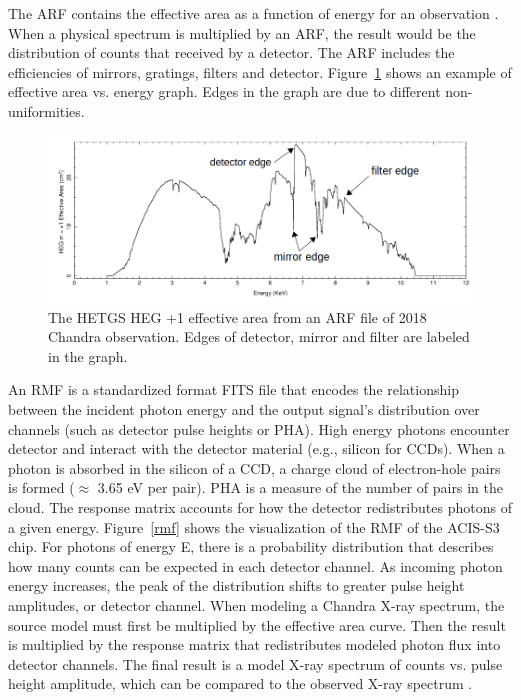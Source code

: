 The ARF contains the effective area as a function of energy for an observation \citep{Huenemoerder_lec_2011}. When a physical spectrum is multiplied by an ARF, the result would be the distribution of counts that received by a detector. The ARF includes the efficiencies of mirrors, gratings, filters and detector.  Figure~\ref{effective} shows an example of effective area vs. energy graph. Edges in the graph are due to different non-uniformities.


\begin{figure}[ht!]
\centering
  \includegraphics[width = \linewidth]{Chapters/Figures/effective_area_label.png}
  \caption{The HETGS HEG +1 effective area from an ARF file of 2018 Chandra observation. Edges of detector, mirror and filter are labeled in the graph.}
  \label{effective}
\end{figure}


An RMF is a standardized format FITS file that encodes the relationship between the incident photon energy and the output signal's distribution over channels (such as detector pulse heights or PHA).  High energy photons encounter detector and interact with the detector material (e.g., silicon for CCDs). When a photon is absorbed in the silicon of a CCD, a charge cloud of electron-hole pairs is formed ($\approx$ 3.65 eV per pair)\citep{Davis2008}. PHA is a measure of the number of pairs in the cloud. The response matrix accounts for how the
detector redistributes photons of a given
energy. Figure~\ref{rmf} shows the visualization of the RMF of the ACIS-S3 chip. For photons of energy E, there is a probability distribution that describes how many counts can be expected in each detector channel. As incoming photon energy increases, the peak of the distribution shifts to greater
pulse height amplitudes, or detector
channel. When modeling a Chandra X-ray spectrum, the source model must first be multiplied by the effective area curve. Then the result is multiplied by the response matrix that redistributes modeled photon flux into detector channels. The final result is a model X-ray spectrum of counts vs. pulse height amplitude, which can be compared to the observed X-ray spectrum \citep{Doe2009}.

